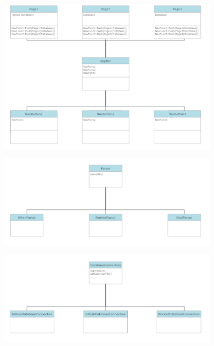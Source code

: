 \begin{figure}
  \centering
  \includegraphics[width=1.1\linewidth]{res/hochgeschobene_nav_funktion.png}
  \label{fig:hochgeschobene_nav_funktion}
\end{figure}


\begin{figure}
  \centering
  \includegraphics[width=1.1\linewidth]{res/strategie_parser.png}
  \label{fig:strategie_parser}
\end{figure}
\begin{figure}
  \centering
  \includegraphics[width=1.1\linewidth]{res/strategie_database.png}
  \label{fig:strategie_database}
\end{figure}

